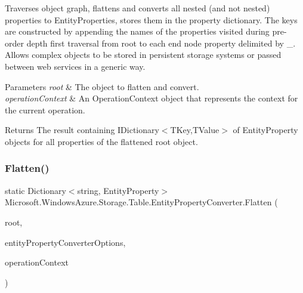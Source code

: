 Traverses object graph, flattens and converts all nested (and not nested) properties to Entity\+Properties, stores them in the property dictionary. The keys are constructed by appending the names of the properties visited during pre-\/order depth first traversal from root to each end node property delimited by \textquotesingle{}\+\_\+\textquotesingle{}. Allows complex objects to be stored in persistent storage systems or passed between web services in a generic way. 


\begin{DoxyParams}{Parameters}
{\em root} & The object to flatten and convert.\\
\hline
{\em operation\+Context} & An Operation\+Context object that represents the context for the current operation.\\
\hline
\end{DoxyParams}
\begin{DoxyReturn}{Returns}
The result containing I\+Dictionary$<$\+T\+Key,\+T\+Value$>$ of Entity\+Property objects for all properties of the flattened root object.
\end{DoxyReturn}
\mbox{\label{classMicrosoft_1_1WindowsAzure_1_1Storage_1_1Table_1_1EntityPropertyConverter_a45373e2614d05c18ecb74bdcafc572b6}} 
\subsubsection{\texorpdfstring{Flatten()}{Flatten()}\hspace{0.1cm}{\footnotesize\ttfamily [2/2]}}
{\footnotesize\ttfamily static Dictionary$<$string, Entity\+Property$>$ Microsoft.\+Windows\+Azure.\+Storage.\+Table.\+Entity\+Property\+Converter.\+Flatten (\begin{DoxyParamCaption}\item[{object}]{root,  }\item[{Entity\+Property\+Converter\+Options}]{entity\+Property\+Converter\+Options,  }\item[{Operation\+Context}]{operation\+Context }\end{DoxyParamCaption})\hspace{0.3cm}{\ttfamily [static]}}



